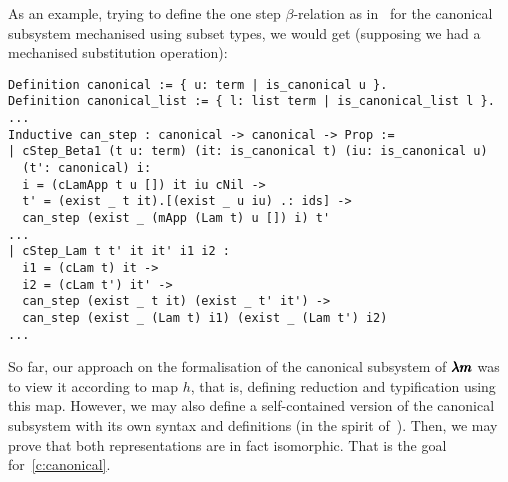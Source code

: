 As an example, trying to define the one step $\beta$-relation as in~\cite[Chapter~3.1]{JCES2002} for the canonical subsystem mechanised using subset types, we would get (supposing we had a mechanised substitution operation):
\begin{lstlisting}[language=Coq]
Definition canonical := { u: term | is_canonical u }. 
Definition canonical_list := { l: list term | is_canonical_list l }.
...
Inductive can_step : canonical -> canonical -> Prop :=
| cStep_Beta1 (t u: term) (it: is_canonical t) (iu: is_canonical u)
  (t': canonical) i:
  i = (cLamApp t u []) it iu cNil ->
  t' = (exist _ t it).[(exist _ u iu) .: ids] ->
  can_step (exist _ (mApp (Lam t) u []) i) t'
...
| cStep_Lam t t' it it' i1 i2 :
  i1 = (cLam t) it ->
  i2 = (cLam t') it' ->
  can_step (exist _ t it) (exist _ t' it') ->
  can_step (exist _ (Lam t) i1) (exist _ (Lam t') i2)
...
\end{lstlisting}

So far, our approach on the formalisation of the canonical subsystem of $\pmb{\lambda m}$ was to view it according to map $h$, that is, defining reduction and typification using this map.
However, we may also define a self-contained version of the canonical subsystem with its own syntax and definitions (in the spirit of~\cite[Chapter~3.1]{JCES2002}). %
Then, we may prove that both representations are in fact isomorphic.
That is the goal for~\cref{c:canonical}.

